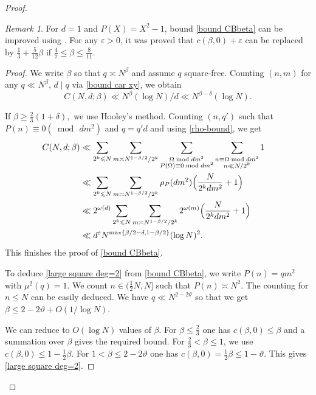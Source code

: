 \documentclass[reqno, 12pt]{amsart}
\theoremstyle{plain}
\theoremstyle{definition}
\theoremstyle{remark}
\newtheorem*{remark}{Remark}
\renewcommand{\le}{\leqslant}
\renewcommand{\leq}{\leqslant}
\renewcommand{\geq}{\geqslant}
\begin{document}
\begin{proof}
 \begin{remark}
    For $d=1$ and $P(X)=X^2-1$, bound \eqref{bound CBbeta} can be improved using \cite[theorem 1]{FJ13}. For any $\varepsilon>0$, it was proved that  $c(\beta,0)+\varepsilon$ can be replaced by $\tfrac13+\tfrac{5}{12}\beta$ if $\tfrac47\leq \beta\leq \tfrac8{11}.$
\end{remark} 
\begin{proof}
We write $\beta $ so that $q \asymp N^{\beta} $ and assume $q$ square-free.
Counting  $(n,m)$ for any $q\ll N^{\beta} $, $d\mid q$ via \eqref{bound car xy}, we obtain $$C(N,d;\beta) \ll N^{ \beta }(\log N)/d\ll N^{ \beta-\delta }(\log N).$$

If $\beta\geq \tfrac23(1+\delta),$ we use Hooley's method.
Counting $(n,q')$ such that $P(n)\equiv 0 (\bmod\, dm^2)$ and $q=q'd$ and using \eqref{rho-bound}, we get 
\begin{align*}
 C(N,d;\beta)&\ll \sum_{2^k\leq N} \sum_{m\asymp N^{1-\beta/2}/2^k}\sum_{\substack{\Omega\bmod dm^2\\ P(\Omega)\equiv 0\bmod dm^2 }}\sum_{\substack{n\equiv \Omega\bmod dm^2\\ n\ll N/2^k}}1\cr&\ll \sum_{2^k\leq N} \sum_{m\asymp N^{1-\beta/2}/2^k}\rho_P(dm^2)\Big( \frac{N}{2^kdm^2}+1\Big)
 \cr&\ll 2^{\omega(d)}\sum_{2^k\leq N} \sum_{m\asymp N^{1-\beta/2}/2^k}2^{\omega(m)}\Big( \frac{N}{2^kdm^2}+1\Big)\cr&\ll  d^\varepsilon N^{\max\{  \beta/2-\delta,1-  \beta/2\}} (\log N)^2 .
 \end{align*}
This finishes the proof of \eqref{bound CBbeta}.



To deduce \eqref{large square deg=2} from \eqref{bound CBbeta}, we write $P(n)=qm^2$ with $\mu^2(q)=1$. 
We count $n\in (\tfrac12 N,N]$ such that $P(n)\asymp N^2.$ The counting for $n\le N$ can be easily deduced.
We have  $q\ll N^{2-2\vartheta}$ so that  
we get %
$\beta\leq 2-2\vartheta+O(1/\log N).$ 

We can reduce to $O(\log N)$ values of $\beta$. 
 For $\beta\le\tfrac23$ one has $c(\beta,0)\le\beta$ and a summation over $\beta$ gives the required bound. For $\tfrac23<\beta\le1$, we use   $c(\beta,0)\le1-\tfrac 12\beta$. For $1<\beta\le2-2\vartheta$ one has $c(\beta,0)=\tfrac12\beta \le1-\vartheta$.  This gives \eqref{large square deg=2}.
% 
\end{proof}
 


\end{proof}
\end{document}
